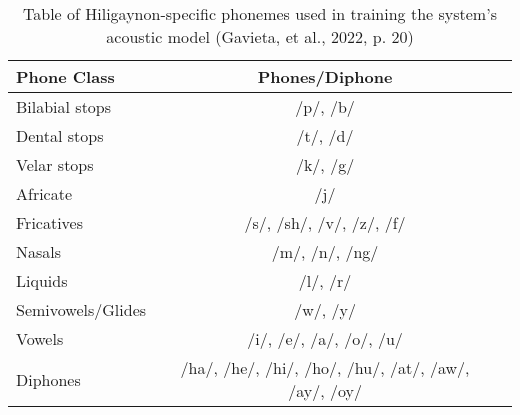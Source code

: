 \begin{table}[htb]   %
	\setlength{\extrarowheight}{0.1em}
	\centering
	\caption{Table of Hiligaynon-specific phonemes used in training the system's acoustic model (Gavieta, et al., 2022, p. 20)} 
	\begin{tabular}{|p{2in}|c|c|} \hline
		\centering Phone Class & Phones/Diphone \\ \hline
		Bilabial stops & /p/, /b/ \\ \hline
		Dental stops & /t/, /d/ \\ \hline
		Velar stops & /k/, /g/  \\ \hline
		Africate & /j/ \\ \hline
		Fricatives & /s/, /sh/, /v/, /z/, /f/  \\ \hline
		Nasals & /m/, /n/, /ng/  \\ \hline
		Liquids & /l/, /r/ \\ \hline
		Semivowels/Glides & /w/, /y/  \\ \hline
		Vowels & /i/, /e/, /a/, /o/, /u/ \\ \hline
		Diphones & /ha/, /he/, /hi/, /ho/, /hu/, /at/, /aw/, /ay/, /oy/ \\ \hline
	\end{tabular}
	\label{tab:phoneme-hiligaynon}
\end{table}















